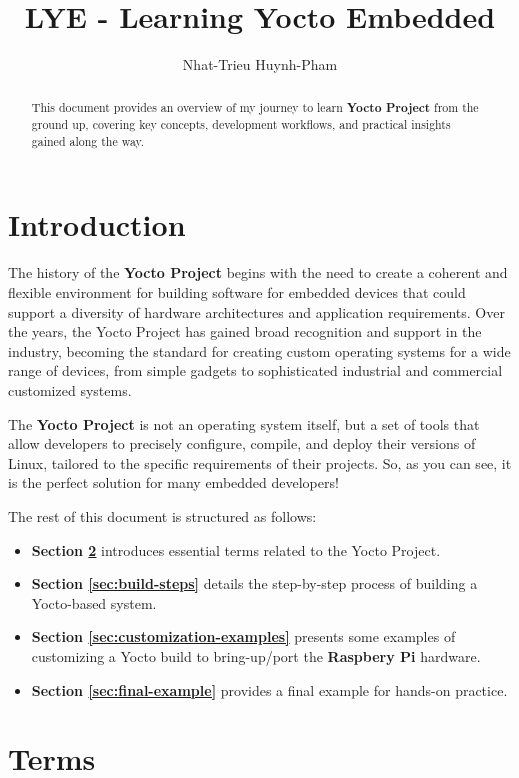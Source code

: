 \documentclass{article}
\title{LYE - Learning Yocto Embedded}
\author{Nhat-Trieu Huynh-Pham}
\begin{document}
\maketitle

\begin{abstract}
This document provides an overview of my journey to learn \textbf{Yocto Project} from the ground up, covering key concepts, development workflows, and practical insights gained along the way.
\end{abstract}

\section{Introduction}

The history of the \textbf{Yocto Project} begins with the need to create a coherent and flexible environment for building software for embedded devices that could support a diversity of hardware architectures and application requirements. Over the years, the Yocto Project has gained broad recognition and support in the industry, becoming the standard for creating custom operating systems for a wide range of devices, from simple gadgets to sophisticated industrial and commercial customized systems.

The \textbf{Yocto Project} is not an operating system itself, but a set of tools that allow developers to precisely configure, compile, and deploy their versions of Linux, tailored to the specific requirements of their projects. So, as you can see, it is the perfect solution for many embedded developers! \cite{scythe2024yocto}

The rest of this document is structured as follows:
\begin{itemize}
    \item \textbf{Section \ref{sec:terms}} introduces essential terms related to the Yocto Project.
    \item \textbf{Section \ref{sec:build-steps}} details the step-by-step process of building a Yocto-based system.
    \item \textbf{Section \ref{sec:customization-examples}} presents some examples of customizing a Yocto build to bring-up/port the \textbf{Raspbery Pi} hardware.
    \item \textbf{Section \ref{sec:final-example}} provides a final example for hands-on practice.
\end{itemize}

\section{Terms} \label{sec:terms}
\end{document}
